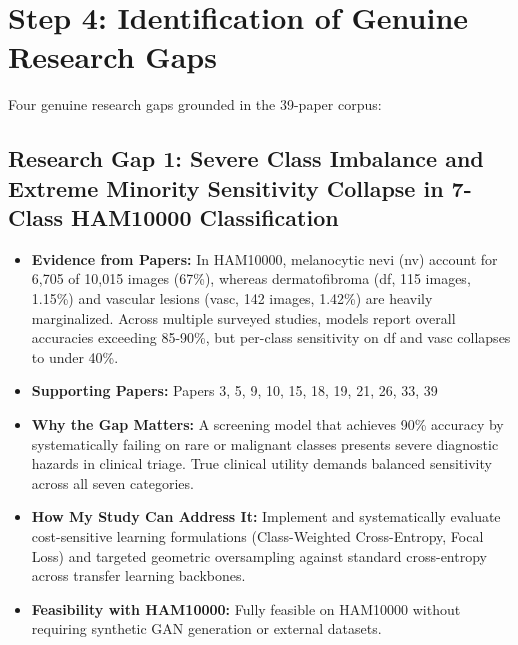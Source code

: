\documentclass[11pt,a4paper]{article}
\begin{document}
\section{Step 4: Identification of Genuine Research Gaps}
Four genuine research gaps grounded in the 39-paper corpus:

\subsection{Research Gap 1: Severe Class Imbalance and Extreme Minority Sensitivity Collapse in 7-Class HAM10000 Classification}
\begin{itemize}
\item \textbf{Evidence from Papers:} In HAM10000, melanocytic nevi (nv) account for 6,705 of 10,015 images (67\%), whereas dermatofibroma (df, 115 images, 1.15\%) and vascular lesions (vasc, 142 images, 1.42\%) are heavily marginalized. Across multiple surveyed studies, models report overall accuracies exceeding 85-90\%, but per-class sensitivity on df and vasc collapses to under 40\%.
\item \textbf{Supporting Papers:} Papers 3, 5, 9, 10, 15, 18, 19, 21, 26, 33, 39
\item \textbf{Why the Gap Matters:} A screening model that achieves 90\% accuracy by systematically failing on rare or malignant classes presents severe diagnostic hazards in clinical triage. True clinical utility demands balanced sensitivity across all seven categories.
\item \textbf{How My Study Can Address It:} Implement and systematically evaluate cost-sensitive learning formulations (Class-Weighted Cross-Entropy, Focal Loss) and targeted geometric oversampling against standard cross-entropy across transfer learning backbones.
\item \textbf{Feasibility with HAM10000:} Fully feasible on HAM10000 without requiring synthetic GAN generation or external datasets.
\end{itemize}
\end{document}
